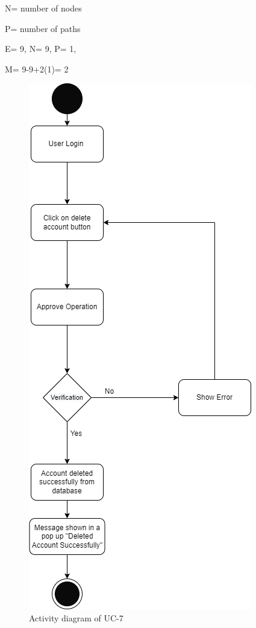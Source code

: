 N= number of nodes

P= number of paths

E= 9,
N= 9,
P= 1,

M= 9-9+2(1)= 2

\begin{figure}[H]
    \centering
    \includegraphics[scale=0.6]{./diagrams/Activity Diagram/ad-07.png}
    \caption{Activity diagram of UC-7}
    \label{fig:act-07}

\end{figure}


